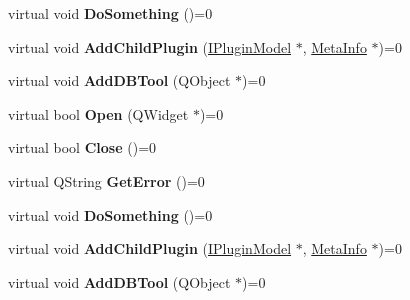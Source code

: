 \begin{DoxyCompactItemize}
\item 
virtual void {\bfseries Do\+Something} ()=0\hypertarget{class_i_plugin_model_a377627e683f892ffda2c6225d975251b}{}\label{class_i_plugin_model_a377627e683f892ffda2c6225d975251b}

\item 
virtual void {\bfseries Add\+Child\+Plugin} (\hyperlink{class_i_plugin_model}{I\+Plugin\+Model} $\ast$, \hyperlink{struct_meta_info}{Meta\+Info} $\ast$)=0\hypertarget{class_i_plugin_model_aff406b0571f6dc77488c315e0df0f563}{}\label{class_i_plugin_model_aff406b0571f6dc77488c315e0df0f563}

\item 
virtual void {\bfseries Add\+D\+B\+Tool} (Q\+Object $\ast$)=0\hypertarget{class_i_plugin_model_a2db1262756c4a587fd6cd2d7191841fb}{}\label{class_i_plugin_model_a2db1262756c4a587fd6cd2d7191841fb}

\item 
virtual bool {\bfseries Open} (Q\+Widget $\ast$)=0\hypertarget{class_i_plugin_model_ac1c51202f69db707ca56e8f3c78ce163}{}\label{class_i_plugin_model_ac1c51202f69db707ca56e8f3c78ce163}

\item 
virtual bool {\bfseries Close} ()=0\hypertarget{class_i_plugin_model_a3f9ce2298f73283fec68fc908db14e57}{}\label{class_i_plugin_model_a3f9ce2298f73283fec68fc908db14e57}

\item 
virtual Q\+String {\bfseries Get\+Error} ()=0\hypertarget{class_i_plugin_model_ad42778c15ce3e8fdb9524a6dfd61792a}{}\label{class_i_plugin_model_ad42778c15ce3e8fdb9524a6dfd61792a}

\item 
virtual void {\bfseries Do\+Something} ()=0\hypertarget{class_i_plugin_model_a377627e683f892ffda2c6225d975251b}{}\label{class_i_plugin_model_a377627e683f892ffda2c6225d975251b}

\item 
virtual void {\bfseries Add\+Child\+Plugin} (\hyperlink{class_i_plugin_model}{I\+Plugin\+Model} $\ast$, \hyperlink{struct_meta_info}{Meta\+Info} $\ast$)=0\hypertarget{class_i_plugin_model_aff406b0571f6dc77488c315e0df0f563}{}\label{class_i_plugin_model_aff406b0571f6dc77488c315e0df0f563}

\item 
virtual void {\bfseries Add\+D\+B\+Tool} (Q\+Object $\ast$)=0\hypertarget{class_i_plugin_model_a2db1262756c4a587fd6cd2d7191841fb}{}\label{class_i_plugin_model_a2db1262756c4a587fd6cd2d7191841fb}


\end{DoxyCompactItemize}
